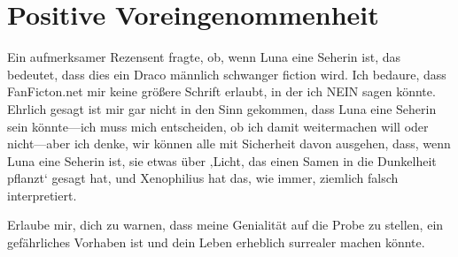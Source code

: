\chapter{Positive Voreingenommenheit}

\begin{chapterOpeningAuthorNote}
% 
Ein aufmerksamer Rezensent fragte, ob, wenn Luna eine Seherin ist, das bedeutet, dass dies ein Draco männlich schwanger fiction wird. Ich bedaure, dass FanFicton.net mir keine größere Schrift erlaubt, in der ich NEIN sagen könnte. Ehrlich gesagt ist mir gar nicht in den Sinn gekommen, dass Luna eine Seherin sein könnte—ich muss mich entscheiden, ob ich damit weitermachen will oder nicht—aber ich denke, wir können alle mit Sicherheit davon ausgehen, dass, wenn Luna eine Seherin ist, sie etwas über ‚Licht, das einen Samen in die Dunkelheit pflanzt‘ gesagt hat, und Xenophilius hat das, wie immer, ziemlich falsch interpretiert.
\end{chapterOpeningAuthorNote}
\begin{chapterOpeningQuote}
Erlaube mir, dich zu warnen, dass meine Genialität auf die Probe zu stellen, ein gefährliches Vorhaben ist und dein Leben erheblich surrealer machen könnte.
\end{chapterOpeningQuote}


